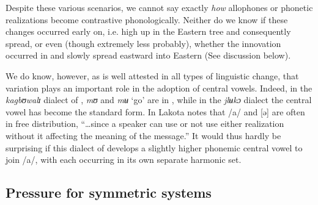 \documentclass[output=paper,newtxmath,modfonts,nonflat]{langsci/langscibook}
\begin{document}
\begin{table}
\caption{Lakota Dida} 
\label{tab:zogbo:23}
\end{table}

Despite these various scenarios, we cannot say exactly \textit{how} allophones or phonetic realizations become contrastive phonologically.  Neither do we know if these changes occurred early on, i.e. high up in the Eastern  tree and consequently spread, or even (though extremely less probably), whether the innovation occurred in  and slowly spread eastward into Eastern  (See discussion below). 

We do know, however, as is well attested in all types of linguistic change, that variation plays an important role in the adoption of central vowels. Indeed, in the \textit{kagbʊwalɪ} dialect of , \textit{mʊ} and \textit{mʉ} ‘go’ are in , while in the \textit{jlʉkɔ} dialect the central vowel has become the standard form. In Lakota  \citet[48]{Guehoun1993} notes that /a/ and [ə] are often in free distribution, “…since a speaker can use or not use either realization without it affecting the meaning of the message.”  It would thus hardly be surprising if this dialect of  develops a slightly higher phonemic central vowel to join /a/, with each occurring in its own separate harmonic set.      

\subsection{Pressure for symmetric systems}\label{sec:zogbo:4.4} 
\end{document}
